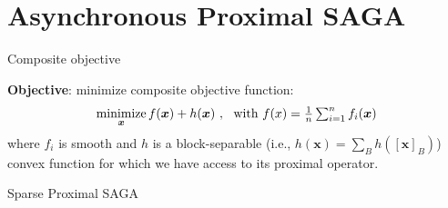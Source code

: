 \documentclass[10pt]{beamer}
\let\oldparencite=\parencite
\renewcommand{\parencite}[1]{\textcolor[rgb]{.7,.7,.7}{\oldparencite{#1}}}
\begin{document}
\section{Asynchronous Proximal SAGA}



\begin{frame}{Composite objective}

\vspace{5mm}
{\bfseries Objective}: minimize composite objective function:
$$
\operatorname*{minimize}_{{\boldsymbol x}} f({\boldsymbol x}) + h({\boldsymbol x})~,~ \text{ with $f(x) = \textstyle \frac{1}{n}\sum_{i=1}^n f_i({\boldsymbol x})$}
$$
where $f_i$ is smooth and $h$ is a block-separable (i.e., $h(\boldsymbol{x}) = \sum_{B} h([\boldsymbol{x}]_B)$) convex function for which we have access to its proximal operator.
\end{frame}



\begin{frame}{Sparse Proximal SAGA}




 
%  
\end{frame}
\end{document}
